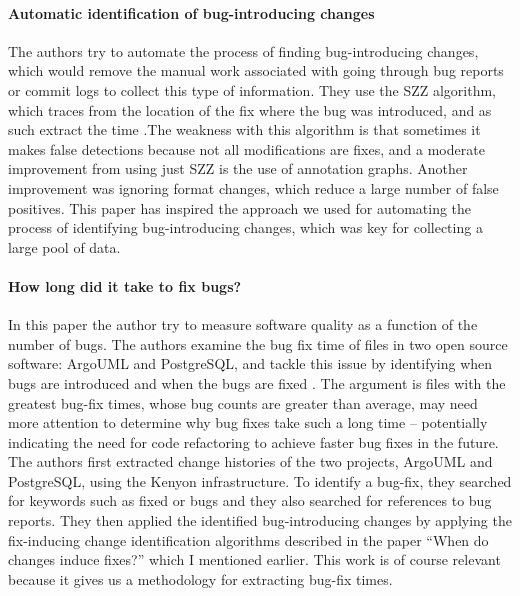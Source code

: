 {\paragraph{Automatic identification of bug-introducing changes}
The authors try to automate the process of finding bug-introducing
changes, which would remove the manual work associated with going
through bug reports or commit logs to collect this type of
information. They use the SZZ algorithm, which traces from the
location of the fix where the bug was introduced, and as such extract
the time \cite{2006-automatic}.The weakness with this algorithm is
that sometimes it makes false detections because not all modifications
are fixes, and a moderate improvement from using just SZZ is the use
of annotation graphs. Another improvement was ignoring format changes,
which reduce a large number of false positives. This paper has
inspired the approach we used for automating the process of
identifying bug-introducing changes, which was key for collecting a
large pool of data.

\paragraph{How long did it take to fix bugs?}
In this paper the author try to measure software quality as a function
of the number of bugs. The authors examine the bug fix time of files
in two open source software: ArgoUML and PostgreSQL, and tackle this
issue by identifying when bugs are introduced and when the bugs are
fixed \cite{2006-long}. The argument is files with the greatest
bug-fix times, whose bug counts are greater than average, may need
more attention to determine why bug fixes take such a long time –
potentially indicating the need for code refactoring to achieve faster
bug fixes in the future. The authors first extracted change histories
of the two projects, ArgoUML and PostgreSQL, using the Kenyon
infrastructure. To identify a bug-fix, they searched for keywords such
as fixed or bugs and they also searched for references to bug
reports. They then applied the identified bug-introducing changes by
applying the fix-inducing change identification algorithms described
in the paper “When do changes induce fixes?” which I mentioned
earlier.  This work is of course relevant because it gives us a
methodology for extracting bug-fix times.

}
